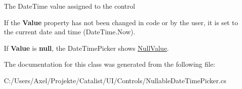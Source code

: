 The Date\+Time value assigned to the control 

If the {\bfseries Value} property has not been changed in code or by the user, it is set to the current date and time (Date\+Time.\+Now).

If {\bfseries Value} is {\bfseries null}, the Date\+Time\+Picker shows \hyperlink{class_products_1_1_u_i_1_1_controls_1_1_nullable_date_time_picker_af74f08ca7e55f46e32b31e053c733157}{Null\+Value}.

The documentation for this class was generated from the following file\+:\begin{DoxyCompactItemize}
\item 
C\+:/\+Users/\+Axel/\+Projekte/\+Catalist/\+U\+I/\+Controls/Nullable\+Date\+Time\+Picker.\+cs\end{DoxyCompactItemize}

